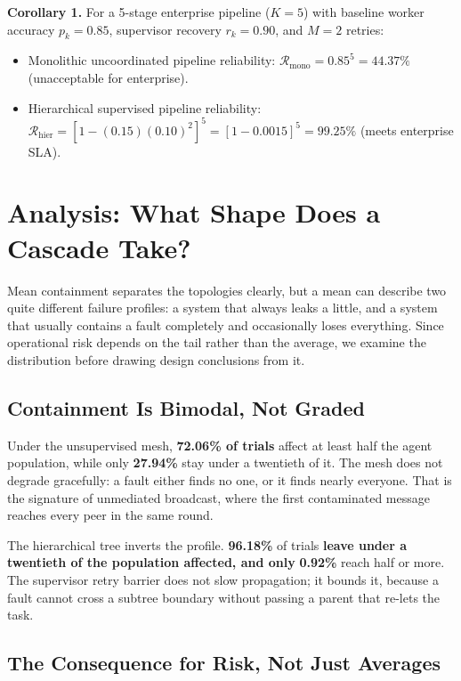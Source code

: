 \documentclass[11pt,a4paper]{article}
\begin{document}
\textbf{Corollary 1.} For a 5-stage enterprise pipeline ($K = 5$) with baseline worker accuracy $p_k = 0.85$, supervisor recovery $r_k = 0.90$, and $M = 2$ retries:
\begin{itemize}
  \item Monolithic uncoordinated pipeline reliability: $\mathcal{R}_{\text{mono}} = 0.85^5 = 44.37\%$ (unacceptable for enterprise).
  \item Hierarchical supervised pipeline reliability: $\mathcal{R}_{\text{hier}} = [1 - (0.15)(0.10)^2]^5 = [1 - 0.0015]^5 = 99.25\%$ (meets enterprise SLA).
\end{itemize}




\section{Analysis: What Shape Does a Cascade Take?}


Mean containment separates the topologies clearly, but a mean can describe two
quite different failure profiles: a system that always leaks a little, and a system
that usually contains a fault completely and occasionally loses everything. Since
operational risk depends on the tail rather than the average, we examine the
distribution before drawing design conclusions from it.


\subsection{Containment Is Bimodal, Not Graded}


Under the unsupervised mesh, \textbf{72.06\% of trials}
affect at least half the agent population, while only
\textbf{27.94\%} stay under a twentieth of it. The mesh
does not degrade gracefully: a fault either finds no one, or it finds nearly
everyone. That is the signature of unmediated broadcast, where the first
contaminated message reaches every peer in the same round.

The hierarchical tree inverts the profile. \textbf{96.18\%}
of trials\textbf{ leave under a twentieth of the population affected, and only}
\textbf{0.92\%} reach half or more. The supervisor
retry barrier does not slow propagation; it bounds it, because a fault cannot cross
a subtree boundary without passing a parent that re-lets the task.


\subsection{The Consequence for Risk, Not Just Averages}
\end{document}
